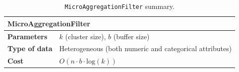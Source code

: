 \begin{table}[h]
	\centering
	\begin{tabular}{@{}ll@{}}
	\toprule
	\multicolumn{2}{l}{\textbf{MicroAggregationFilter}}                             \\ \midrule
	\textbf{Parameters}   & $k$ (cluster size), $b$ (buffer size)                   \\
	\textbf{Type of data} & Heterogeneous (both numeric and categorical attributes) \\
	\textbf{Cost}         & $O(n \cdot b \cdot \mathrm{log}(k))$                    \\ \bottomrule
	\end{tabular}
	\caption{\texttt{MicroAggregationFilter} summary.}
	\label{table:microaggregation-summary}
\end{table}